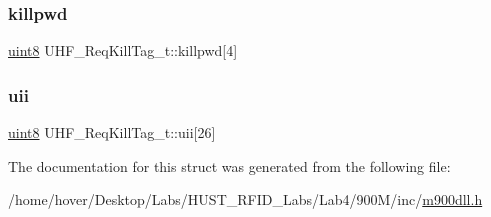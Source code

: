 \subsubsection{\texorpdfstring{killpwd}{killpwd}}
{\footnotesize\ttfamily \mbox{\hyperlink{m900dll_8h_adde6aaee8457bee49c2a92621fe22b79}{uint8}} U\+H\+F\+\_\+\+Req\+Kill\+Tag\+\_\+t\+::killpwd\mbox{[}4\mbox{]}}

\mbox{\label{struct_u_h_f___req_kill_tag__t_aca9f65bc530545e42fc892c181123ada}} 
\subsubsection{\texorpdfstring{uii}{uii}}
{\footnotesize\ttfamily \mbox{\hyperlink{m900dll_8h_adde6aaee8457bee49c2a92621fe22b79}{uint8}} U\+H\+F\+\_\+\+Req\+Kill\+Tag\+\_\+t\+::uii\mbox{[}26\mbox{]}}



The documentation for this struct was generated from the following file\+:\begin{DoxyCompactItemize}
\item 
/home/hover/\+Desktop/\+Labs/\+H\+U\+S\+T\+\_\+\+R\+F\+I\+D\+\_\+\+Labs/\+Lab4/900\+M/inc/\mbox{\hyperlink{m900dll_8h}{m900dll.\+h}}\end{DoxyCompactItemize}
